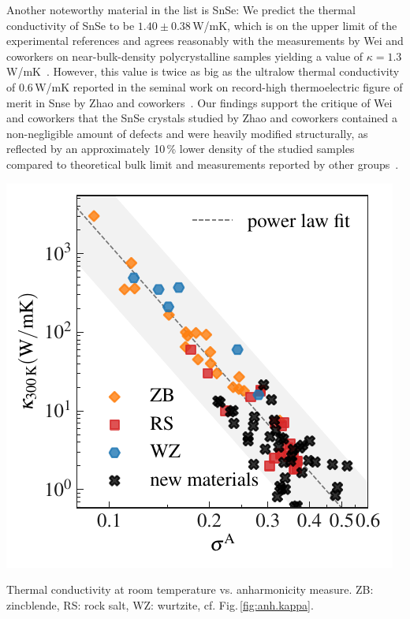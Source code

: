 Another noteworthy material in the list is SnSe: We predict the thermal conductivity of SnSe to be $1.40 \pm 0.38$\,W/mK, which is on the upper limit of the experimental references and agrees reasonably with the measurements by Wei and coworkers on near-bulk-density polycrystalline samples yielding a value of $\kappa = 1.3$\,W/mK~\cite{Wei.2016}.
However, this value is twice as big as the ultralow thermal conductivity of $0.6$\,W/mK reported in the seminal work on record-high thermoelectric figure of merit in Snse by Zhao and coworkers~\cite{Zhao.2014}. Our findings support the critique of Wei and coworkers that the SnSe crystals studied by Zhao and coworkers contained a non-negligible amount of defects and were heavily modified structurally, as reflected by an approximately 10\,\% lower density of the studied samples compared to theoretical bulk limit and measurements reported by other groups~\cite{Wei.2016}.
%
\begin{marginfigure}
	\includegraphics[width=\textwidth]{./data/plots/anharmonicity/9_kappa/incl_computations/sigma_vs_kappa_annot_comp_margin.pdf}
	\caption{
	Thermal conductivity at room temperature vs. anharmonicity measure. ZB: zincblende, RS: rock salt, WZ: wurtzite, cf. Fig.\,\ref{fig:anh.kappa}.}
	\label{fig:kappa_sigma_exp_comp}
\end{marginfigure}
%
